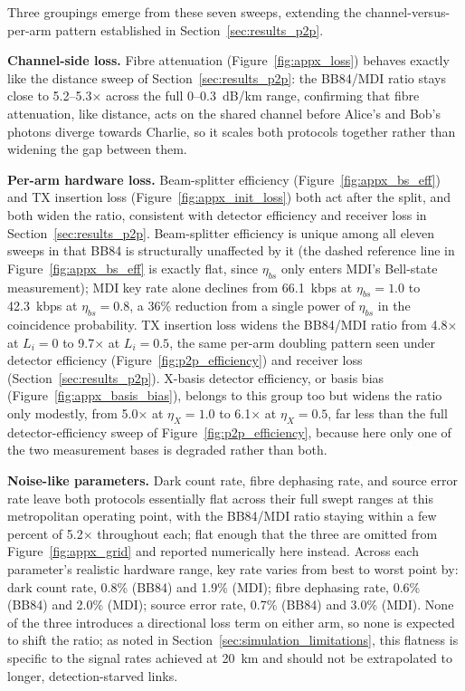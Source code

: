 \documentclass[12pt]{article}
\begin{document}
Three groupings emerge from these seven sweeps, extending the channel-versus-per-arm pattern established in Section~\ref{sec:results_p2p}.

\textbf{Channel-side loss.} Fibre attenuation (Figure~\ref{fig:appx_loss}) behaves exactly like the distance sweep of Section~\ref{sec:results_p2p}: the BB84/MDI ratio stays close to 5.2--5.3$\times$ across the full 0--0.3~dB/km range, confirming that fibre attenuation, like distance, acts on the shared channel before Alice's and Bob's photons diverge towards Charlie, so it scales both protocols together rather than widening the gap between them.

\textbf{Per-arm hardware loss.} Beam-splitter efficiency (Figure~\ref{fig:appx_bs_eff}) and TX insertion loss (Figure~\ref{fig:appx_init_loss}) both act after the split, and both widen the ratio, consistent with detector efficiency and receiver loss in Section~\ref{sec:results_p2p}. Beam-splitter efficiency is unique among all eleven sweeps in that BB84 is structurally unaffected by it (the dashed reference line in Figure~\ref{fig:appx_bs_eff} is exactly flat, since $\eta_{bs}$ only enters MDI's Bell-state measurement); MDI key rate alone declines from 66.1~kbps at $\eta_{bs}=1.0$ to 42.3~kbps at $\eta_{bs}=0.8$, a 36\% reduction from a single power of $\eta_{bs}$ in the coincidence probability. TX insertion loss widens the BB84/MDI ratio from 4.8$\times$ at $L_i=0$ to 9.7$\times$ at $L_i=0.5$, the same per-arm doubling pattern seen under detector efficiency (Figure~\ref{fig:p2p_efficiency}) and receiver loss (Section~\ref{sec:results_p2p}). X-basis detector efficiency, or basis bias (Figure~\ref{fig:appx_basis_bias}), belongs to this group too but widens the ratio only modestly, from 5.0$\times$ at $\eta_X=1.0$ to 6.1$\times$ at $\eta_X=0.5$, far less than the full detector-efficiency sweep of Figure~\ref{fig:p2p_efficiency}, because here only one of the two measurement bases is degraded rather than both.

\textbf{Noise-like parameters.} Dark count rate, fibre dephasing rate, and source error rate leave both protocols essentially flat across their full swept ranges at this metropolitan operating point, with the BB84/MDI ratio staying within a few percent of 5.2$\times$ throughout each; flat enough that the three are omitted from Figure~\ref{fig:appx_grid} and reported numerically here instead. Across each parameter's realistic hardware range, key rate varies from best to worst point by: dark count rate, 0.8\% (BB84) and 1.9\% (MDI); fibre dephasing rate, 0.6\% (BB84) and 2.0\% (MDI); source error rate, 0.7\% (BB84) and 3.0\% (MDI). None of the three introduces a directional loss term on either arm, so none is expected to shift the ratio; as noted in Section~\ref{sec:simulation_limitations}, this flatness is specific to the signal rates achieved at 20~km and should not be extrapolated to longer, detection-starved links.
\end{document}
